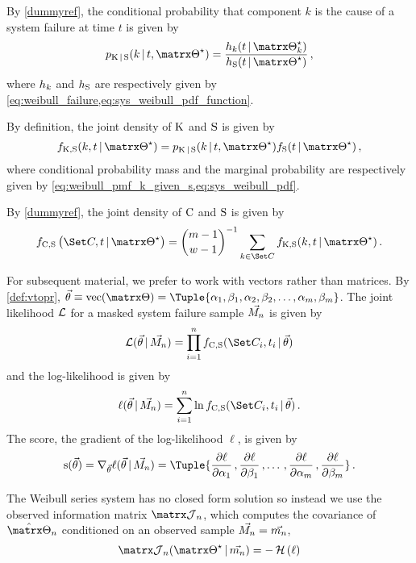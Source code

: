 \documentclass[../main.tex]{subfiles}
\begin{document}
By \cref{dummyref}, the conditional probability that component $k$ is the cause of a system failure at time $t$ is given by
\begin{equation}
\label{eq:weibull_pmf_k_given_s}
\pmf_{\RV{K} \given \sv}(k \given t, \tparam\sysparam) = \frac
    {\haz_k(t \given \tparam\sysparam_k)}
    {\haz_{\sv}(t \given \tparam\sysparam)}\,,
\end{equation}
where $h_k$ and $h_{\mathrm{S}}$ are respectively given by \cref{eq:weibull_failure,eq:sys_weibull_pdf_function}.

By definition, the joint density of $\mathrm{K}$ and $\mathrm{S}$ is given by
\begin{equation}
\label{eq:weibull_joint_k_s}
\pdf_{\RV{K}, \sv}( k, t \given \tparam\sysparam) =
    \pmf_{\RV{K} \given \sv}(k \given t, \tparam\sysparam) \pdf_\sv(t \given \tparam\sysparam)\,,
\end{equation}
where conditional probability mass and the marginal probability are respectively given by \cref{eq:weibull_pmf_k_given_s,eq:sys_weibull_pdf}.

By \cref{dummyref}, the joint density of $\mathrm{C}$ and $\mathrm{S}$ is given by
\begin{equation}
\label{eq:weibull_joint_cand_density}
\pdf_{\rvcand, \sv}\left(\cand, t \given \tparam\sysparam \right) =
    {{m-1} \choose {w-1}}^{-1} \sum_{k \in \cand} \pdf_{\RV{K}, \sv}( k, t \given \tparam\sysparam)\,.
\end{equation}

For subsequent material, we prefer to work with vectors rather than matrices. By \cref{def:vtopr}, $\sysparamvec \equiv \vtopr(\sysparam) = \Tuple{\alpha_1,\beta_1,\alpha_2,\beta_2,\ldots,\alpha_m,\beta_m}$.
The joint likelihood $\operatorname{\mathcal{L}}$ for a masked system failure sample $\vec{M_n}$ is given by
\begin{equation}
\likelihood(\sysparamvec \given \mfs) =
    \prod_{i=1}^{n} \pdf_{\rvcand, \sv}(\cand_i, t_i \given \sysparamvec)
\end{equation}
and the log-likelihood is given by
\begin{equation}
    \ell(\sysparamvec \given \mfs) =
        \sum_{i=1}^{n} \ln \pdf_{\rvcand, \sv}(\cand_i, t_i \given \sysparamvec)\,.
\end{equation}
The score, the gradient of the log-likelihood $\ell$, is given by
\begin{equation}
    \score(\sysparamvec) = \nabla_{\sysparamvec} \ell(\sysparamvec \given \mfs) = \Tuple{
        \ppderivative{\ell}{\alpha_1}\,,
        \ppderivative{\ell}{\beta_1}\,,
        \ldots\,,
        \ppderivative{\ell}{\alpha_m}\,,
        \ppderivative{\ell}{\beta_m}}\,.
\end{equation}

The Weibull series system has no closed form solution so instead we use the observed information matrix $\observed_n$,
which computes the covariance of $\estimator{\sysparam}_n$ conditioned on an observed sample $\vec{M_n} = \vec{m_n}$,
\begin{equation}
\label{info_matrix_weibull}
    \observed_n(\tparam\sysparam \given \mfso) = -\hessian\left(\ell\right)
\end{equation}    
\end{document}
